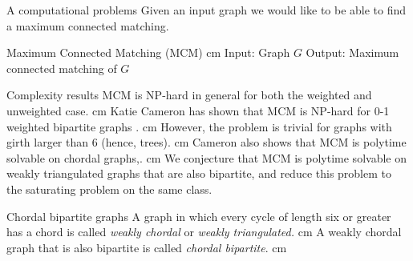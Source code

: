 \documentclass{beamer}
\newcommand{\bframe}[2]{\begin{frame}{#1}#2\end{frame}}
\begin{document}
\bframe{A computational problems}{
	Given an input graph we would like to be able to find a maximum connected matching.\pause
 	\begin{framed}
  		Maximum Connected Matching (MCM)
  		\vskip 0.25 cm Input: Graph $G$
  		\newline Output: Maximum connected matching of $G$
 	\end{framed}
}

\bframe{Complexity results}{
	MCM is NP-hard in general for both the weighted and unweighted case. \pause\vskip 0.5 cm
	 Katie Cameron has shown that MCM is NP-hard for 0-1 weighted bipartite graphs \cite{MR2163948}.\pause\vskip 0.5 cm
	 However, the problem is trivial for graphs with girth larger than 6 (hence, trees).\pause\vskip 0.5 cm
	Cameron also shows that MCM is polytime solvable on chordal graphs,.\pause \vskip 0.5 cm
 	We conjecture that MCM is polytime solvable on weakly triangulated graphs that are also bipartite, and reduce this problem to the saturating problem on the same class.}
	 
\bframe{Chordal bipartite graphs}{
A graph in which every cycle of length six or greater has a chord is called {\it weakly chordal} or {\it weakly triangulated.}
\pause\vskip 0.5 cm
A weakly chordal graph that is also bipartite is called {\it chordal bipartite}.\pause\vskip 0.5 cm
\begin{center}  \end{center}
}
\end{document}
